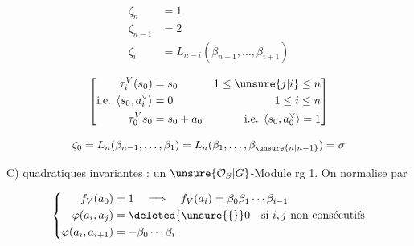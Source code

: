 
\[
\begin{aligned}
\zeta_n&=1\\
\zeta_{n-1}&=2\\
\zeta_i&=L_{n-i}(\beta_{n-1},\ldots,\beta_{i+1})
\end{aligned}
\]

\[
\left[\begin{aligned}
\tau_i^V(s_0)&=s_0 &1\le\unsure{j|i}\le n\\
\text{i.e. }\langle s_0,a_i^\vee\rangle&=0 &1\le i\le n\\
\tau_0^V s_0&=s_0+a_0 &\text{i.e. }\langle s_0,a_0^\vee\rangle=1
\end{aligned}\right]
\]

\[
\zeta_0=L_n(\beta_{n-1},\ldots,\beta_1)=L_n(\beta_1,\ldots,\beta_{\unsure{n|n-1}})=\sigma
\]

C)  quadratiques invariantes :   un  $\unsure{\mathcal O_S|G}$-Module   rg 1. On normalise par

\[
\left\{\begin{aligned}
f_V(a_0)&=1\quad\Longrightarrow\quad f_V(a_i)=\beta_0\beta_1\cdots\beta_{i-1}\\
\varphi(a_i,a_j)&=\deleted{\unsure{\{} }0\quad\text{si } i,j\text{ non consécutifs}\\
\varphi(a_i,a_{i+1})&=-\beta_0\cdots\beta_i
\end{aligned}\right.
\]
